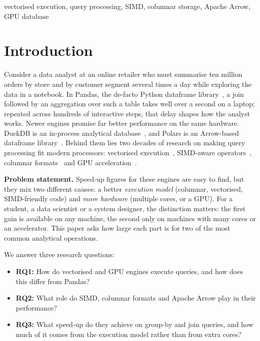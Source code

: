 \documentclass[conference,a4paper]{IEEEtran}
\begin{document}
\begin{IEEEkeywords}
vectorised execution, query processing, SIMD, columnar storage, Apache Arrow, GPU database
\end{IEEEkeywords}

\section{Introduction}
Consider a data analyst at an online retailer who must summarise ten million orders by store and by customer segment several times a day while exploring the data in a notebook. In Pandas, the de-facto Python dataframe library~\cite{mckinney10}, a join followed by an aggregation over such a table takes well over a second on a laptop; repeated across hundreds of interactive steps, that delay shapes how the analyst works. Newer engines promise far better performance on the same hardware. DuckDB is an in-process analytical database~\cite{raasveldt19}, and Polars is an Arrow-based dataframe library~\cite{polars,arrow}. Behind them lies two decades of research on making query processing fit modern processors: vectorised execution~\cite{boncz05}, SIMD-aware operators~\cite{polychroniou15}, columnar formats~\cite{zeng23} and GPU acceleration~\cite{shanbhag20,paul21}.

\textbf{Problem statement.} Speed-up figures for these engines are easy to find, but they mix two different causes: a better \emph{execution model} (columnar, vectorised, SIMD-friendly code) and \emph{more hardware} (multiple cores, or a GPU). For a student, a data scientist or a system designer, the distinction matters: the first gain is available on any machine, the second only on machines with many cores or an accelerator. This paper asks how large each part is for two of the most common analytical operations.

We answer three research questions:
\begin{itemize}
\item \textbf{RQ1:} How do vectorised and GPU engines execute queries, and how does this differ from Pandas?
\item \textbf{RQ2:} What role do SIMD, columnar formats and Apache Arrow play in their performance?
\item \textbf{RQ3:} What speed-up do they achieve on group-by and join queries, and how much of it comes from the execution model rather than from extra cores?
\end{itemize}
\end{document}
